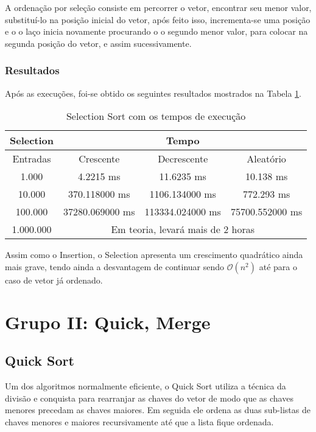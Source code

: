 \documentclass[
	12pt,				%
	openany,
	a4paper,			%
	english,			%
	french,				%
	spanish,			%
	brazil,				%
	]{abntex2}
\begin{document}
    A ordenação por seleção consiste em percorrer o vetor, encontrar seu menor valor,  substituí-lo na posição inicial do vetor, após feito isso, incrementa-se uma posição e o o laço inicia novamente procurando o o segundo menor valor, para colocar na segunda posição do vetor, e assim sucessivamente.
    
    	\subsection{Resultados}
    	Após as execuções, foi-se obtido os seguintes resultados mostrados na Tabela \ref{tab:selection}.
    	
    	\begin{table}[H]
\centering
\begin{tabular}{|c|c|c|c|}
\hline
Selection & \multicolumn{3}{c|}{Tempo}                             \\ \hline
Entradas  & Crescente        & Decrescente       & Aleatório       \\ \hline
1.000     & 4.2215 ms        & 11.6235 ms        & 10.138 ms       \\ \hline
10.000    & 370.118000 ms    & 1106.134000 ms    & 772.293 ms      \\ \hline
100.000   & 37280.069000 ms  & 113334.024000 ms  & 75700.552000 ms \\ \hline
1.000.000 & \multicolumn{3}{c|}{Em teoria, levará mais de 2 horas} \\ \hline
\end{tabular}
\caption{Selection Sort com os tempos de execução}
\label{tab:selection}
\end{table}
    
    Assim como o Insertion, o Selection apresenta um crescimento quadrático ainda mais grave, tendo ainda a desvantagem de continuar sendo $\mathcal{O}(n^2)$ até para o caso de vetor já ordenado.
    
\chapter{Grupo II: Quick, Merge}

	\section{Quick Sort}
	
	Um dos algoritmos normalmente eficiente, o Quick Sort utiliza a técnica da divisão e conquista para rearranjar as chaves do vetor de modo que as chaves menores precedam as chaves maiores. Em seguida ele ordena as duas sub-listas de chaves menores e maiores recursivamente até que a lista fique ordenada.
	
\end{document}
